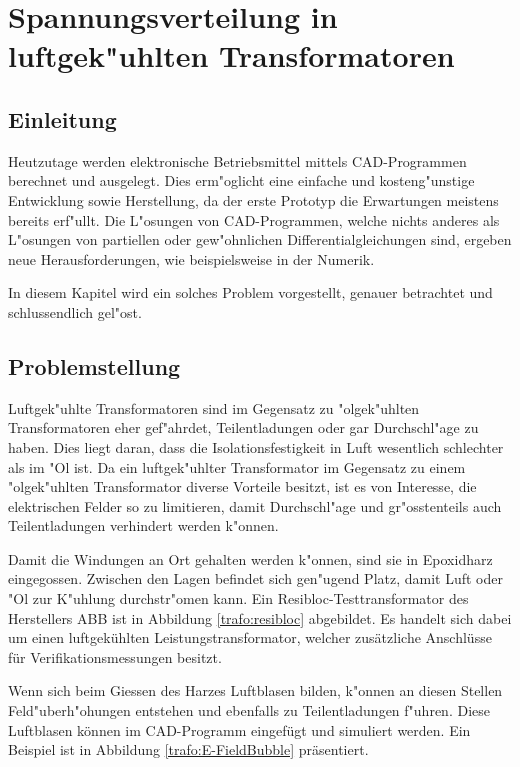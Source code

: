 \chapter{Spannungsverteilung in luftgek"uhlten Transformatoren\label{chapter:thema}}
\begin{refsection}

\section{Einleitung}

Heutzutage werden elektronische Betriebsmittel mittels CAD-Programmen berechnet und ausgelegt. Dies erm"oglicht eine einfache und kosteng"unstige Entwicklung sowie Herstellung, da der erste Prototyp die Erwartungen meistens bereits erf"ullt. Die L"osungen von CAD-Programmen, welche nichts anderes als L"osungen von partiellen oder gew"ohnlichen Differentialgleichungen sind, ergeben neue Herausforderungen, wie beispielsweise in der Numerik. 

In diesem Kapitel wird ein solches Problem vorgestellt, genauer betrachtet und schlussendlich gel"ost.

\section{Problemstellung}

Luftgek"uhlte Transformatoren sind im Gegensatz zu "olgek"uhlten Transformatoren eher gef"ahrdet, Teilentladungen oder gar Durchschl"age zu haben. Dies liegt daran, dass die Isolationsfestigkeit in Luft wesentlich schlechter als im "Ol ist. Da ein luftgek"uhlter Transformator im Gegensatz zu einem "olgek"uhlten Transformator diverse Vorteile besitzt, ist es von Interesse, die elektrischen Felder so zu limitieren, damit Durchschl"age und gr"osstenteils auch Teilentladungen verhindert werden k"onnen. 

Damit die Windungen an Ort gehalten werden k"onnen, sind sie in Epoxidharz eingegossen. Zwischen den Lagen befindet sich gen"ugend Platz, damit Luft oder "Ol zur K"uhlung durchstr"omen kann. Ein Resibloc-Testtransformator des Herstellers ABB ist in Abbildung \ref{trafo:resibloc} abgebildet. Es handelt sich dabei um einen luftgekühlten Leistungstransformator, welcher zusätzliche Anschlüsse für Verifikationsmessungen besitzt. 

Wenn sich beim Giessen des Harzes Luftblasen bilden, k"onnen an diesen Stellen Feld"uberh"ohungen entstehen und ebenfalls zu Teilentladungen f"uhren. Diese Luftblasen können im CAD-Programm eingefügt und simuliert werden. Ein Beispiel ist in Abbildung \ref{trafo:E-FieldBubble} präsentiert.


\end{refsection}
